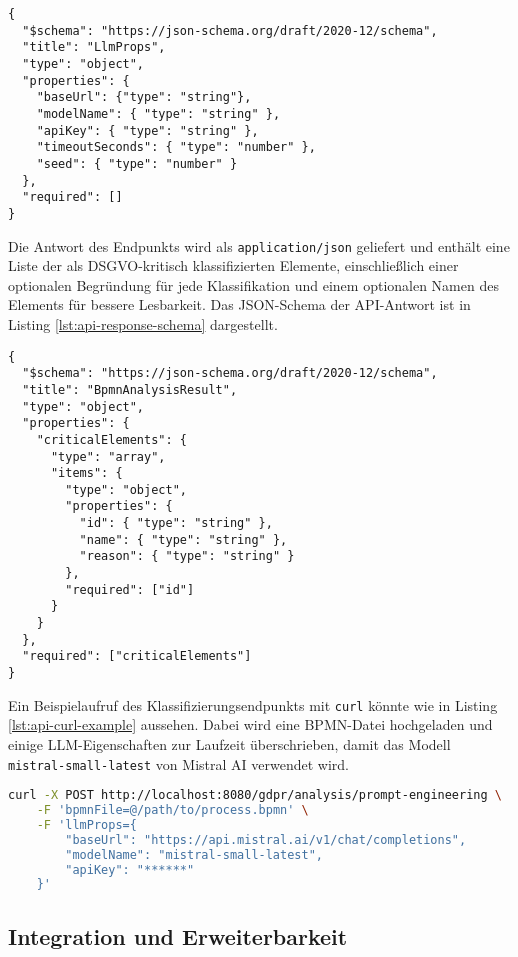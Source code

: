 \begin{lstlisting}[caption={JSON-Schema der \texttt{llmProps}.},label={lst:api-request-schema}]
{
  "$schema": "https://json-schema.org/draft/2020-12/schema",
  "title": "LlmProps",
  "type": "object",
  "properties": {
    "baseUrl": {"type": "string"},
    "modelName": { "type": "string" },
    "apiKey": { "type": "string" },
    "timeoutSeconds": { "type": "number" },
    "seed": { "type": "number" }
  },
  "required": []
}
\end{lstlisting}

Die Antwort des Endpunkts wird als \texttt{application/json} geliefert und enthält eine Liste der als \ac{DSGVO}-kritisch klassifizierten Elemente, einschließlich einer optionalen Begründung für jede Klassifikation und einem optionalen Namen des Elements für bessere Lesbarkeit. Das JSON-Schema der API-Antwort ist in Listing \ref{lst:api-response-schema} dargestellt.

\begin{lstlisting}[caption={JSON-Schema der API-Antwort.},label={lst:api-response-schema}]
{
  "$schema": "https://json-schema.org/draft/2020-12/schema",
  "title": "BpmnAnalysisResult",
  "type": "object",
  "properties": {
    "criticalElements": {
      "type": "array",
      "items": {
        "type": "object",
        "properties": {
          "id": { "type": "string" },
          "name": { "type": "string" },
          "reason": { "type": "string" }
        },
        "required": ["id"]
      }
    }
  },
  "required": ["criticalElements"]
}
\end{lstlisting}

Ein Beispielaufruf des Klassifizierungsendpunkts mit \texttt{curl} könnte wie in Listing \ref{lst:api-curl-example} aussehen. Dabei wird eine BPMN-Datei hochgeladen und einige \ac{LLM}-Eigenschaften zur Laufzeit überschrieben, damit das Modell \texttt{mistral-small-latest} von Mistral AI verwendet wird.

\begin{lstlisting}[language=bash,caption={Beispielaufruf des Klassifizierungsendpunkts mit \texttt{curl}.},label={lst:api-curl-example}]
curl -X POST http://localhost:8080/gdpr/analysis/prompt-engineering \
    -F 'bpmnFile=@/path/to/process.bpmn' \
    -F 'llmProps={
        "baseUrl": "https://api.mistral.ai/v1/chat/completions",
        "modelName": "mistral-small-latest",
        "apiKey": "******"
    }'
\end{lstlisting}

\subsection*{Integration und Erweiterbarkeit}


